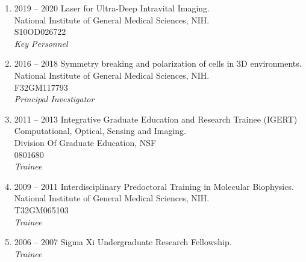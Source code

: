 \begin{enumerate}
\item 2019 -- 2020 
\hspace{8pt} 
Laser for Ultra-Deep Intravital Imaging.\\
National Institute of General Medical Sciences, NIH. \\
S10OD026722 \\
{\it Key Personnel}

\item 2016 -- 2018 
\hspace{8pt} 
Symmetry breaking and polarization of cells in 3D environments.\\
National Institute of General Medical Sciences, NIH.\\
F32GM117793 \\
{\it Principal Investigator} 

\item 2011 -- 2013 
\hspace{8pt}
Integrative Graduate Education and Research Trainee (IGERT)\\
Computational, Optical, Sensing and Imaging.\\
Division Of Graduate Education, NSF \\
0801680\\
{\it Trainee}

\item 2009 -- 2011
\hspace{8pt}
Interdisciplinary Predoctoral Training in Molecular Biophysics. \\
National Institute of General Medical Sciences, NIH. \\
T32GM065103 \\
{\it Trainee}

\item 2006 -- 2007 
\hspace{8pt} 
Sigma Xi Undergraduate Research Fellowship. \\
{\it Trainee}

\end{enumerate}
